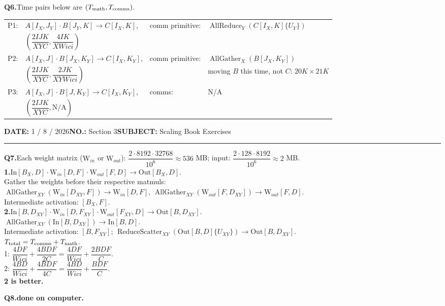 \documentclass[10pt]{article}
\newcommand{\note}[1]{\textcolor{blue!55!black}{#1}}
\newcommand{\answer}[1]{\textcolor{blue!65!black}{\textbf{#1}}}
\newcommand{\question}[1]{\par\vspace{0.9em}\noindent\textbf{#1}\quad}
\newcommand{\meta}[2]{\textbf{#1} #2\hspace{2.5em}}
\newcommand{\allreduce}{\operatorname{AllReduce}}
\newcommand{\allgather}{\operatorname{AllGather}}
\newcommand{\rs}{\operatorname{ReduceScatter}}
\newcommand{\pagehead}[2]{%
 {\small\meta{DATE:}{#1}\meta{NO.:}{#2}\meta{SUBJECT:}{Scaling Book Exercises}}\par\vspace{0.8em}\hrule\vspace{0.8em}}
\begin{document}
\question{Q6.}Time pairs below are $(T_{\rm math},T_{\rm comms})$.\\
\begin{tabular}{@{}ll@{\qquad}ll@{}}
P1: & $A[I_X,J_Y]\cdot B[J_Y,K]\to C[I_X,K]$, & comm primitive: & $\allreduce_Y(C[I_X,K]\{U_Y\})$\\
 & $\left(\dfrac{2IJK}{XYC},\dfrac{4IK}{XWici}\right)$ && \\[0.6em]
P2: & $A[I_X,J]\cdot B[J_X,K_Y]\to C[I_X,K_Y]$, & comm primitive: & $\allgather_X(B[J_X,K_Y])$\\
 & $\left(\dfrac{2IJK}{XYC},\dfrac{2JK}{XYWici}\right)$ && \note{moving $B$ this time, not $C$: $20K\times21K$}\\[0.6em]
P3: & $A[I_X,J]\cdot B[J,K_Y]\to C[I_X,K_Y]$, & comms: & N/A\\
 & $\left(\dfrac{2IJK}{XYC},\mathrm{N/A}\right)$ &&
\end{tabular}

\newpage
\pagehead{1 / 8 / 2026}{Section 3}
\question{Q7.}Each weight matrix ($\mathrm{W}_{in}$ or $\mathrm{W}_{out}$): $\dfrac{2\cdot8192\cdot32768}{10^6}\approx536$ MB; input: $\dfrac{2\cdot128\cdot8192}{10^6}\approx2$ MB.\\
\textbf{1.}\quad $\mathrm{In}[B_X,D]\cdot\mathrm{W}_{in}[D,F]\cdot\mathrm{W}_{out}[F,D]\to\mathrm{Out}[B_X,D]$.\\
Gather the weights before their respective matmuls:\\
$\allgather_{XY}(\mathrm{W}_{in}[D_{XY},F])\to\mathrm{W}_{in}[D,F]$,\quad
$\allgather_{XY}(\mathrm{W}_{out}[F,D_{XY}])\to\mathrm{W}_{out}[F,D]$.\\
Intermediate activation: $[B_X,F]$.\\
\textbf{2.}\quad $\mathrm{In}[B,D_{XY}]\cdot\mathrm{W}_{in}[D,F_{XY}]\cdot\mathrm{W}_{out}[F_{XY},D]\to\mathrm{Out}[B,D_{XY}]$.\\
$\allgather_{XY}(\mathrm{In}[B,D_{XY}])\to\mathrm{In}[B,D]$.\\
Intermediate activation: $[B,F_{XY}]$; $\rs_{XY}(\mathrm{Out}[B,D]\{U_{XY}\})\to\mathrm{Out}[B,D_{XY}]$.\\
$T_{\rm total}=T_{\rm comms}+T_{\rm math}$.\\
1: $\dfrac{4DF}{Wici}+\dfrac{4BDF}{2C}=\dfrac{4DF}{Wici}+\dfrac{2BDF}{C}$.\\
2: $\dfrac{4BD}{Wici}+\dfrac{4BDF}{4C}=\dfrac{4BD}{Wici}+\dfrac{BDF}{C}$.\\
\answer{2 is better.}
\question{Q8.}\answer{done on computer.}
\end{document}
